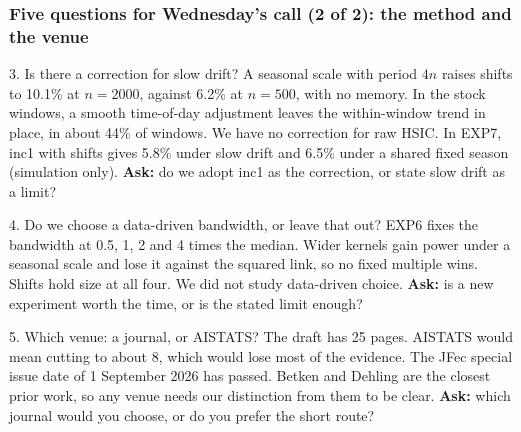 \documentclass[11pt, aspectratio=169, xcolor={dvipsnames}]{beamer}
\begin{document}
\begin{frame}
\frametitle{Five questions for Wednesday's call (2 of 2): the method and the venue}
\begin{block}{3. Is there a correction for slow drift?}\footnotesize
A seasonal scale with period $4n$ raises shifts to 10.1\% at $n=2000$, against 6.2\% at $n=500$, with no memory. In the stock windows, a smooth time-of-day adjustment leaves the within-window trend in place, in about 44\% of windows. We have no correction for raw HSIC. In EXP7, inc1 with shifts gives 5.8\% under slow drift and 6.5\% under a shared fixed season (simulation only). \textbf{Ask:} do we adopt inc1 as the correction, or state slow drift as a limit?
\end{block}
\begin{block}{4. Do we choose a data-driven bandwidth, or leave that out?}\footnotesize
EXP6 fixes the bandwidth at 0.5, 1, 2 and 4 times the median. Wider kernels gain power under a seasonal scale and lose it against the squared link, so no fixed multiple wins. Shifts hold size at all four. We did not study data-driven choice. \textbf{Ask:} is a new experiment worth the time, or is the stated limit enough?
\end{block}
\begin{block}{5. Which venue: a journal, or AISTATS?}\footnotesize
The draft has 25 pages. AISTATS would mean cutting to about 8, which would lose most of the evidence. The JFec special issue date of 1 September 2026 has passed. Betken and Dehling are the closest prior work, so any venue needs our distinction from them to be clear. \textbf{Ask:} which journal would you choose, or do you prefer the short route?
\end{block}
\end{frame}
\end{document}
